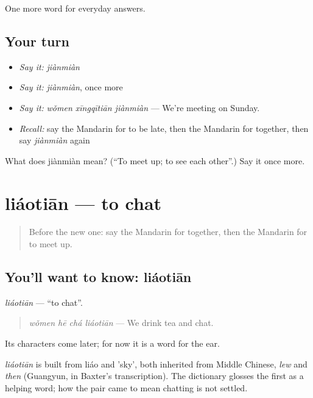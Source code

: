 \begin{grammarlens}[title={What you've built}]
One more word for everyday answers.
\end{grammarlens}

\subsection*{Your turn}
\begin{itemize}
\raggedright
  \item \emph{Say it:} \emph{jiànmiàn}
  \item \emph{Say it:} \emph{jiànmiàn}, once more
  \item \emph{Say it:} \emph{wǒmen xīngqītiān jiànmiàn} — We're meeting on Sunday.
  \item \emph{Recall:} say the Mandarin for to be late, then the Mandarin for together, then say \emph{jiànmiàn} again
\end{itemize}

\begin{tcolorbox}[breakable,colback=teal!4,colframe=teal!35!black,title={Before you move on}]
What does jiànmiàn mean? (\textquotedblleft{}To meet up; to see each other\textquotedblright{}.) Say it once more.
\end{tcolorbox}
\section[liáotiān]{liáotiān — to chat}

\label{lesson:ZH-C84-liaotian}



\begin{quote}
Before the new one: say the Mandarin for together, then the Mandarin for to meet up.
\end{quote}

\subsection*{You'll want to know: liáotiān}
\emph{liáotiān} — \textquotedblleft{}to chat\textquotedblright{}.

\begin{quote}
\emph{wǒmen hē chá liáotiān} — We drink tea and chat.
\end{quote}

Its characters come later; for now it is a word for the ear.

\begin{cousinweb}
\emph{liáotiān} is built from liáo and  'sky', both inherited from Middle Chinese, \emph{lew} and \emph{then} (Guangyun, in Baxter's transcription). The dictionary glosses the first as a helping word; how the pair came to mean chatting is not settled.
\end{cousinweb}

